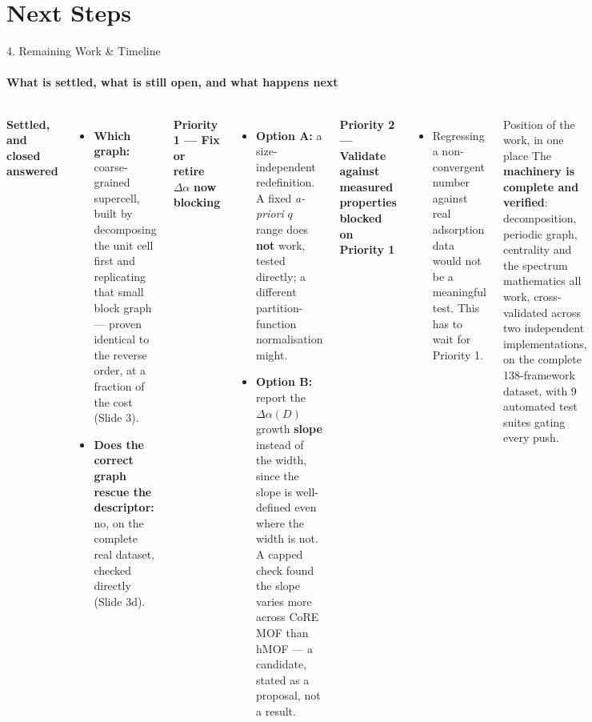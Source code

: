 \documentclass[aspectratio=169, 11pt]{beamer}
\begin{document}
\section{Next Steps}
\begin{frame}{4. Remaining Work \& Timeline}
\framesubtitle{What is settled, what is still open, and what happens next}
\vspace{-0.3cm}
\begin{columns}[T]
{\scriptsize
\setlength{\itemsep}{0pt}\setlength{\parskip}{1pt}
\textbf{Settled, and closed} \hfill \textcolor{okGreen}{\textbf{answered}}
\begin{itemize}\scriptsize
  \item \textbf{Which graph:} coarse-grained supercell, built by decomposing the unit cell
        first and replicating that small block graph --- proven identical to the reverse
        order, at a fraction of the cost (Slide 3).
  \item \textbf{Does the correct graph rescue the descriptor:} no, on the complete real
        dataset, checked directly (Slide 3d).
\end{itemize}

\textbf{Priority 1 --- Fix or retire $\Delta\alpha$} \hfill \textcolor{warnRed}{\textbf{now blocking}}
\begin{itemize}\scriptsize
  \item \textbf{Option A:} a size-independent redefinition. A fixed \textit{a-priori} $q$
        range does \textbf{not} work, tested directly; a different partition-function
        normalisation might.
  \item \textbf{Option B:} report the $\Delta\alpha(D)$ growth \textbf{slope} instead of the
        width, since the slope is well-defined even where the width is not. A capped check
        found the slope varies more across CoRE MOF than hMOF --- a candidate, stated as a
        proposal, not a result.
\end{itemize}

\textbf{Priority 2 --- Validate against measured properties} \hfill \textcolor{warnRed}{\textbf{blocked on Priority 1}}
\begin{itemize}\scriptsize
  \item Regressing a non-convergent number against real adsorption data would not be a
        meaningful test. This has to wait for Priority 1.
\end{itemize}
}
\begin{block}{\footnotesize Position of the work, in one place}
\scriptsize
The \textbf{machinery is complete and verified}: decomposition, periodic graph, centrality
and the spectrum mathematics all work, cross-validated across two independent
implementations, on the complete 138-framework dataset, with 9 automated test suites gating
every push.


\end{block}
\end{columns}
\end{frame}
\end{document}

